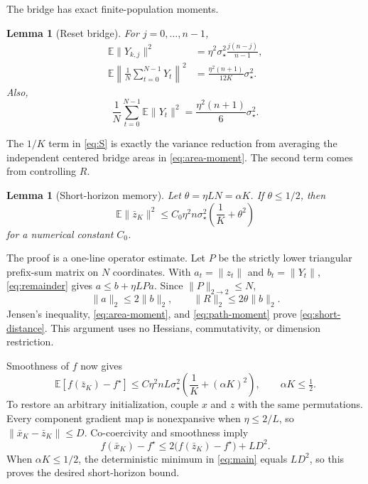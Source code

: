 \documentclass{article}
\newtheorem{lemma}[theorem]{Lemma}
\theoremstyle{remark}
\newcommand{\E}{\mathbb E}
\newcommand{\1}{\mathbf 1}
\begin{document}
The bridge has exact finite-population moments.
\begin{lemma}[Reset bridge]\label{lem:bridge}
For $j=0,\ldots,n-1$,
\begin{align}
 \E\|Y_{k,j}\|^2
 &=\eta^2\sigma_\star^2\frac{j(n-j)}{n-1},            \label{eq:prefix-moment}\\
 \E\left\|\frac1N\sum_{t=0}^{N-1}Y_t\right\|^2
 &=\frac{\eta^2(n+1)}{12K}\sigma_\star^2.            \label{eq:area-moment}
\end{align}
Also,
\begin{equation}
 \frac1N\sum_{t=0}^{N-1}\E\|Y_t\|^2
 =\frac{\eta^2(n+1)}6\sigma_\star^2.                 \label{eq:path-moment}
\end{equation}
\end{lemma}

The $1/K$ term in \eqref{eq:S} is exactly the variance reduction from averaging the independent centered bridge areas in \eqref{eq:area-moment}. The second term comes from controlling $R$.

\begin{lemma}[Short-horizon memory]\label{lem:memory}
Let $\theta=\eta LN=\alpha K$. If $\theta\leq1/2$, then
\begin{equation}
 \E\|\bar z_K\|^2
 \leq C_0\eta^2n\sigma_\star^2
 \left(\frac1K+\theta^2\right)                       \label{eq:short-distance}
\end{equation}
for a numerical constant $C_0$.
\end{lemma}

The proof is a one-line operator estimate. Let $P$ be the strictly lower triangular prefix-sum matrix on $N$ coordinates. With $a_t=\|z_t\|$ and $b_t=\|Y_t\|$, \eqref{eq:remainder} gives $a\leq b+\eta LPa$. Since $\|P\|_{2\to2}\leq N$, \[ \|a\|_2\leq2\|b\|_2, \qquad \|R\|_2\leq2\theta\|b\|_2. \] Jensen's inequality, \eqref{eq:area-moment}, and \eqref{eq:path-moment} prove \eqref{eq:short-distance}. This argument uses no Hessians, commutativity, or dimension restriction.

Smoothness of $f$ now gives
\begin{equation}
 \E[f(\bar z_K)-f^\star]
 \leq C\eta^2nL\sigma_\star^2
 \left(\frac1K+(\alpha K)^2\right),
 \qquad \alpha K\leq\tfrac12.                        \label{eq:short-function}
\end{equation}
To restore an arbitrary initialization, couple $x$ and $z$ with the same permutations. Every component gradient map is nonexpansive when $\eta\leq2/L$, so $\|\bar x_K-\bar z_K\|\leq D$. Co-coercivity and smoothness imply
\begin{equation}
 f(\bar x_K)-f^\star
 \leq2\bigl(f(\bar z_K)-f^\star\bigr)+LD^2.           \label{eq:couple}
\end{equation}
When $\alpha K\leq1/2$, the deterministic minimum in \eqref{eq:main} equals $LD^2$, so this proves the desired short-horizon bound.
\end{document}
